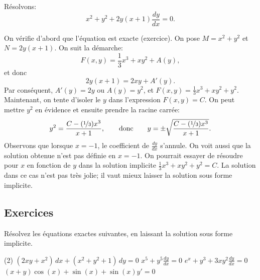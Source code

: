 \begin{example} \label{exact:exampleabove}
	Résolvons:
	\begin{equation*}
		x^2+y^2 + 2y(x+1) \frac{dy}{dx} = 0 .
	\end{equation*}

	On vérifie d'abord que l'équation est exacte (exercice).
	On pose $M= x^2+y^2$ et $N=2y(x+1)$.
	On suit la démarche:
	\begin{equation*}
		F(x, y) = \frac{1}{3}x^3 + xy^2 + A(y),
	\end{equation*}
	et  donc
	\begin{equation*}
		2y(x+1) = 2xy + A'(y) .
	\end{equation*}
	Par conséquent, $A'(y) = 2y$ ou $A(y) = y^2$, et $F(x,y) = \frac{1}{3}x^3 + xy^2 + y^2$.
	Maintenant, on tente d'isoler le $y$ dans l'expression $F(x,y) = C$.  On peut mettre $y^2$ en évidence et ensuite prendre la racine carrée:
	\begin{equation*}
		y^2 = \frac{C-(\nicefrac{1}{3})x^3}{x+1},\qquad \text{donc} \qquad 	y = \pm \sqrt{\frac{C-(\nicefrac{1}{3})x^3}{x+1}}.
	\end{equation*}
	Observons que lorsque $x=-1$, le coefficient de $\frac{dy}{dx}$ s'annule.
	On voit aussi que la solution obtenue n'est pas définie en $x=-1$.
	On pourrait essayer de résoudre pour $x$ en fonction de $y$ dans la solution implicite $\frac{1}{3}x^3 + xy^2 + y^2 = C$.
	La solution dans ce cas n'est pas très jolie; il vaut mieux laisser la solution sous forme implicite.
\end{example}



\subsection{Exercices}

\begin{exercise}
	Résolvez les équations exactes suivantes, en laissant la solution sous forme implicite.
	\begin{tasks}(2)
		\task $(2 xy + x^2) \, dx + (x^2+y^2+1) \, dy = 0$
		\task $x^5 + y^5 \frac{dy}{dx} = 0$
		\task $e^x+y^3 + 3xy^2 \frac{dy}{dx} = 0$
		\task $(x+y)\cos(x)+\sin(x) + \sin(x)y' = 0$
	\end{tasks}
\end{exercise}


